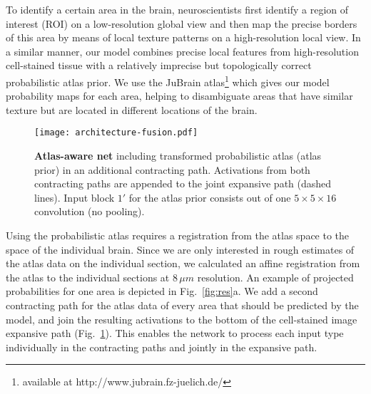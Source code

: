 \documentclass{article}
\begin{document}
To identify a certain area in the brain, neuroscientists first identify a region of interest (ROI) on a low-resolution global view and then map the precise borders of this area by means of local texture patterns on a high-resolution local view.
In a similar manner, our model combines precise local features from high-resolution cell-stained tissue with a relatively imprecise but topologically correct probabilistic atlas prior.
We use the JuBrain atlas\footnote{available at http://www.jubrain.fz-juelich.de/} which gives our model probability maps for each area, helping to disambiguate areas that have similar texture but are located in different locations of the brain.

\begin{figure}
	\texttt{[image: architecture-fusion.pdf]}
	\caption{
		\textbf{Atlas-aware net} including transformed probabilistic atlas (atlas prior) in an additional contracting path.
		Activations from both contracting paths are appended to the joint expansive path (dashed lines).
		Input block $1'$ for the atlas prior consists out of one $5\times5\times16$ convolution (no pooling).
	}
	\label{fig:arch-fusion}
\end{figure}


Using the probabilistic atlas requires a registration from the atlas space to the space of the individual brain.
Since we are only interested in rough estimates of the atlas data on the individual section, we calculated an affine registration from the atlas to the individual sections at $8\,\mu m$ resolution.
An example of projected probabilities for one area is depicted in Fig.~\ref{fig:res}a.
%
We add a second contracting path for the atlas data of every area that should be predicted by the model, and join the resulting activations to the bottom of the cell-stained image expansive path (Fig.~\ref{fig:arch-fusion}).
This enables the network to process each input type individually in the contracting paths and jointly in the expansive path.
\end{document}
